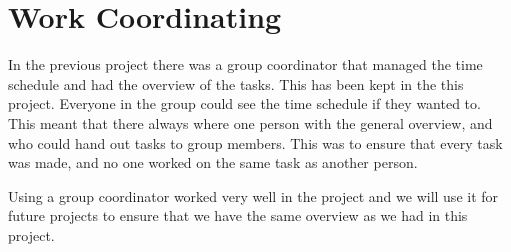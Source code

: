 \section{Work Coordinating}
In the previous project there was a group coordinator that managed the time schedule and had the overview of the tasks. This has been kept in the this project. Everyone in the group could see the time schedule if they wanted to. This meant that there always where one person with the general overview, and who could hand out tasks to group members. This was to ensure that every task was made, and no one worked on the same task as another person.

Using a group coordinator worked very well in the project and we will use it for future projects to ensure that we have the same overview as we had in this project.